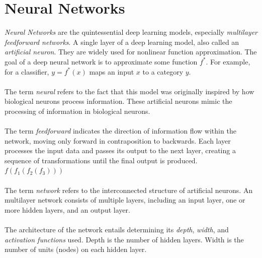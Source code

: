 \documentclass[../main.tex]{subfiles}
\begin{document}
	\chapter{Neural Networks} \label{ch:neural}

\noindent \textit{Neural Networks} are the quintessential deep learning models, especially \textit{multilayer feedforward networks}.  A single layer of a deep learning model, also called an\textit{ artificial neuron}. They are widely used for nonlinear function approximation. The goal of a deep neural network is to approximate some function $f^*$. For example, for a classifier, $y = f^*(x)$ maps an input $x$ to a category $y$.  \\ \\ 
\noindent The term \textit{neural} refers  to the fact that this model was originally inspired by how biological neurons process information. These artificial neurons mimic the processing of information in biological neurons. \\ \\ 
\noindent The term \textit{feedforward} indicates the direction of information flow within the network, moving only forward in contraposition to backwards. Each layer processes the input data and passes its output to the next layer, creating a sequence of transformations until the final output is produced. $f(f_1(f_2(f_3)))$ \\ \\
\noindent The term \textit{network} refers to the interconnected structure of artificial neurons. An multilayer network consists of multiple layers, including an input layer, one or more hidden layers, and an output layer. \\ \\ %
\noindent The architecture of the network entails determining its \textit{depth}, \textit{width}, and \textit{activation functions} used. Depth is the number of hidden layers. Width is the number of units (nodes) on each hidden layer. 
\end{document}
